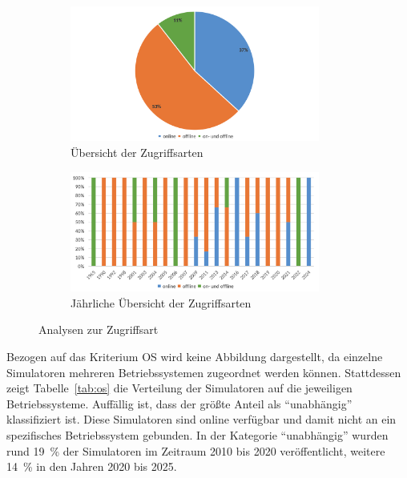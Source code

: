 \begin{figure}[!htbp]
    \centering
    \begin{subfigure}[b]{0.48\textwidth}
        \centering
        \includegraphics[width=0.90\textwidth]{graphics_sim/3-zugriff.png}
        \caption{Übersicht der Zugriffsarten}
        \label{fig:3-zugriff}
    \end{subfigure}
    \hfill
    \begin{subfigure}[b]{0.48\textwidth}
        \centering
        \includegraphics[width=0.90\textwidth]{graphics_sim/4-zugriff-jahr.png}
        \caption{Jährliche Übersicht der Zugriffsarten}
        \label{fig:4-zugriff-jahr}
    \end{subfigure}
    \caption{Analysen zur Zugriffsart}
    \label{fig:zugriff-gesamt}
\end{figure}

Bezogen auf das Kriterium \ac{OS} wird keine Abbildung dargestellt, da einzelne Simulatoren mehreren Betriebssystemen zugeordnet werden können. Stattdessen zeigt Tabelle~\ref{tab:os} die Verteilung der Simulatoren auf die jeweiligen Betriebssysteme. Auffällig ist, dass der größte Anteil als \enquote{unabhängig} klassifiziert ist. Diese Simulatoren sind online verfügbar und damit nicht an ein spezifisches Betriebssystem gebunden. In der Kategorie \enquote{unabhängig} wurden rund 19~\% der Simulatoren im Zeitraum 2010 bis 2020 veröffentlicht, weitere 14~\% in den Jahren 2020 bis 2025.


